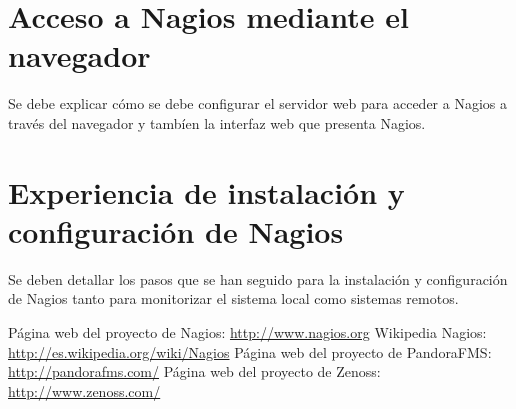 \documentclass[11pt,a4paper]{article}
\begin{document}
\section{Acceso a Nagios mediante el navegador}

Se debe explicar cómo se debe configurar el servidor web para acceder a Nagios a través del navegador
y  tambíen la interfaz web que presenta Nagios.

\section{Experiencia de instalación y configuración de  Nagios}

Se deben detallar los pasos que se han seguido para la instalación y configuración de Nagios
tanto para monitorizar el sistema local como sistemas remotos.

\begin{thebibliography}{1}

 Página web del proyecto de Nagios: \url{http://www.nagios.org}
 Wikipedia Nagios: \url{http://es.wikipedia.org/wiki/Nagios}
 Página web del proyecto de PandoraFMS: \url{http://pandorafms.com/}
 Página web del proyecto de Zenoss: \url{http://www.zenoss.com/}
\end{thebibliography}
\end{document}
